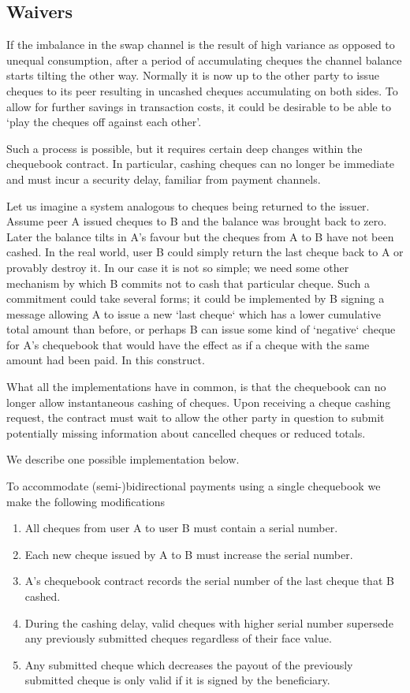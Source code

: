 \subsection{Waivers}
\label{subsubsec:waivingdebt}

If the imbalance in the swap channel is the result of high variance as opposed to unequal consumption, after a period of accumulating cheques the channel balance starts tilting the other way. Normally it is now up to the other party to issue cheques to its peer resulting in uncashed cheques accumulating on both sides.
To allow for further savings in transaction costs, it could be desirable to be able to `play the cheques off against each other'.

Such a process is possible, but it requires certain deep changes within the chequebook contract. In particular, cashing cheques can no longer be immediate and must incur a security delay, familiar from payment channels.

Let us imagine a system analogous to cheques being returned to the issuer.  
Assume peer A issued cheques to B and the balance was brought back to zero. Later the balance tilts in A's favour but the cheques from A to B have not been cashed. In the real world, user B could simply return the last cheque back to A or provably destroy it. In our case it is not so simple; we need some other mechanism by which B commits not to cash that particular cheque. Such a commitment could take several forms; it could be implemented by B signing a message allowing A to issue a new `last cheque` which has a lower cumulative total amount than before, or perhaps B can issue some kind of `negative` cheque for A's chequebook that would have the effect as if a cheque with the same amount had been paid. In this construct.

What all the implementations have in common, is that the chequebook can no longer allow instantaneous cashing of cheques. Upon receiving a cheque cashing request, the contract must wait to allow the other party in question to submit potentially missing information about cancelled cheques or reduced totals. 

We describe one possible implementation below.

To accommodate (semi-)bidirectional payments using a single chequebook we make the following modifications

\begin{enumerate}
    \item All cheques from user A to user B must contain a serial number.
    \item Each new cheque issued by A to B must increase the serial number.
    \item A's chequebook contract records the serial number of the last cheque that B cashed.
    \item During the cashing delay, valid cheques with higher serial number supersede any previously submitted cheques regardless of their face value.
    \item Any submitted cheque which decreases the payout of the previously submitted cheque is only valid if it is signed by the beneficiary.
\end{enumerate}

